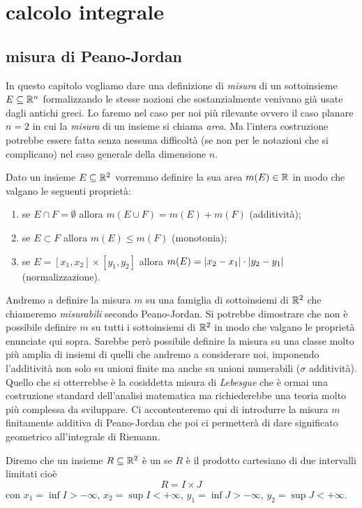 \chapter{calcolo integrale}

\section{misura di Peano-Jordan}

In questo capitolo vogliamo dare una definizione di \emph{misura} di un
sottoinsieme $E\subseteq \mathbb R^n$ formalizzando le stesse nozioni che sostanzialmente
venivano già usate dagli antichi greci.
Lo faremo nel caso per noi più rilevante ovvero il caso planare $n=2$ in cui la \emph{misura}
di un insieme si chiama \emph{area}.
Ma l'intera costruzione potrebbe essere fatta senza
nessuna difficoltà (se non per le notazioni che si complicano) nel caso generale della
dimensione $n$.

Dato un insieme $E\subseteq \mathbb R^2$ vorremmo definire la sua area $m(E)\in \mathbb R$
in modo che valgano le seguenti proprietà:
\begin{enumerate}
  \item se $E\cap F=\emptyset$ allora $m(E\cup F) = m(E) + m(F)$ (additività);
  \item se $E \subset F$ allora $m(E) \le m(F)$ (monotonia);
  \item se $E=[x_1,x_2]\times [y_1,y_2]$
  allora $m(E) = {\left|x_2-x_1\right|}\cdot {\left|y_2-y_1\right|}$ (normalizzazione).
\end{enumerate}

Andremo a definire la misura $m$ su una famiglia di sottoinsiemi di $\mathbb R^2$ che
chiameremo \emph{misurabili} secondo Peano-Jordan.
Si potrebbe dimostrare che non è possibile definire $m$ su tutti i sottoinsiemi di $\mathbb R^2$
in modo che valgano le proprietà enunciate qui sopra.
Sarebbe però possibile
definire la misura su una classe molto più amplia di insiemi di quelli che andremo a considerare noi, 
imponendo l'additività non solo su unioni finite ma anche su unioni numerabili
($\sigma$ additività).
Quello che si otterrebbe
è la cosiddetta misura di \emph{Lebesgue} che è ormai una costruzione standard
dell'analisi matematica ma richiederebbe una teoria molto più complessa da sviluppare.
Ci accontenteremo qui di introdurre la misura $m$ finitamente additiva di Peano-Jordan
che poi ci permetterà di dare significato geometrico all'integrale di Riemann.

Diremo che un insieme $R\subseteq \mathbb R^2$ è un
se $R$ è il prodotto cartesiano di due intervalli limitati
cioè
\[
  R = I\times J
\]
con $x_1=\inf I>-\infty$,
$x_2=\sup I<+\infty$,
$y_1=\inf J > -\infty$,
$y_2=\sup J < +\infty$.

